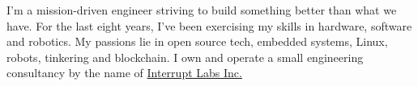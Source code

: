 \documentclass[9pt]{developercv} %
\begin{document}
\begin{minipage}[t]{0.4\textwidth} %
	\vspace{-\baselineskip} %

I'm a mission-driven engineer striving to build something better than what we have. For the last eight years, I've been exercising my skills in hardware, software and robotics. My passions lie in open source tech, embedded systems, Linux, robots, tinkering and blockchain. I own and operate a small engineering consultancy by the name of \href{interruptlabs.ca/}{Interrupt Labs Inc.}

\end{minipage}
\hfill %
\begin{minipage}[t]{0.5\textwidth} %
	\vspace{-\baselineskip} %
	\begin{barchart}{5.5}
	\end{barchart}
\end{minipage}

\end{document}
